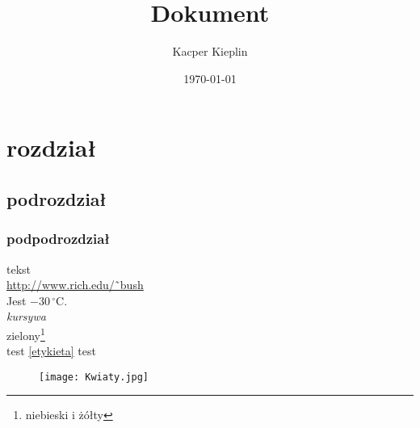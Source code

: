 \documentclass[a4paper,11pt]{article}
\title{Dokument}
\author{Kacper Kieplin}
\date{ \today}
\begin{document}
\maketitle
\begin{center}
\tableofcontents
\end{center}

\section{rozdział}
\subsection{podrozdział}
\subsubsection{podpodrozdział} 

tekst\\
\url{http://www.rich.edu/˜bush}\\
Jest $-30\,^{\circ}\mathrm{C}$.\\
\emph{kursywa}\\
zielony\footnote{niebieski i żółty}\\

\label{etykieta}
test
\ref{etykieta}
test
\pageref{etykieta}

\begin{figure}
\centering
\texttt{[image: Kwiaty.jpg]}
\end{figure}
\end{document}
